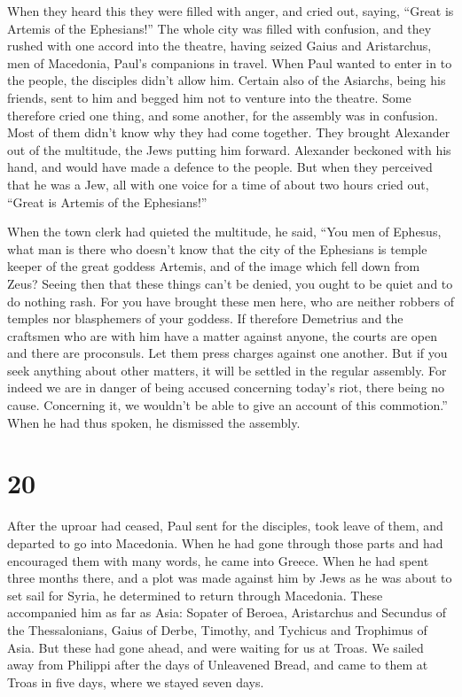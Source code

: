  When they heard this they were filled with anger, and
cried out, saying, ``Great is Artemis of the Ephesians!'' 
The whole city was filled with confusion, and they rushed with one
accord into the theatre, having seized Gaius and Aristarchus, men of
Macedonia, Paul's companions in travel.  When Paul wanted
to enter in to the people, the disciples didn't allow him. 
Certain also of the Asiarchs, being his friends, sent to him and begged
him not to venture into the theatre.  Some therefore cried
one thing, and some another, for the assembly was in confusion. Most of
them didn't know why they had come together.  They brought
Alexander out of the multitude, the Jews putting him forward. Alexander
beckoned with his hand, and would have made a defence to the people.
 But when they perceived that he was a Jew, all with one
voice for a time of about two hours cried out, ``Great is Artemis of the
Ephesians!''

 When the town clerk had quieted the multitude, he said,
``You men of Ephesus, what man is there who doesn't know that the city
of the Ephesians is temple keeper of the great goddess Artemis, and of
the image which fell down from Zeus?  Seeing then that
these things can't be denied, you ought to be quiet and to do nothing
rash.  For you have brought these men here, who are neither
robbers of temples nor blasphemers of your goddess.  If
therefore Demetrius and the craftsmen who are with him have a matter
against anyone, the courts are open and there are proconsuls. Let them
press charges against one another.  But if you seek
anything about other matters, it will be settled in the regular
assembly.  For indeed we are in danger of being accused
concerning today's riot, there being no cause. Concerning it, we
wouldn't be able to give an account of this commotion.'' 
When he had thus spoken, he dismissed the assembly.

\hypertarget{section-19}{%
\section{20}\label{section-19}}

 After the uproar had ceased, Paul sent for the disciples,
took leave of them, and departed to go into Macedonia.  When
he had gone through those parts and had encouraged them with many words,
he came into Greece.  When he had spent three months there,
and a plot was made against him by Jews as he was about to set sail for
Syria, he determined to return through Macedonia.  These
accompanied him as far as Asia: Sopater of Beroea, Aristarchus and
Secundus of the Thessalonians, Gaius of Derbe, Timothy, and Tychicus and
Trophimus of Asia.  But these had gone ahead, and were
waiting for us at Troas.  We sailed away from Philippi after
the days of Unleavened Bread, and came to them at Troas in five days,
where we stayed seven days.

